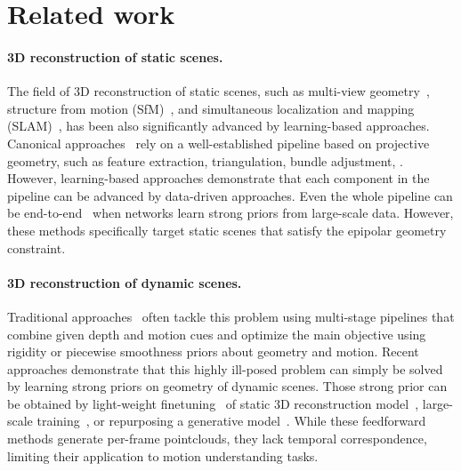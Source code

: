 \section{Related work}
\label{sec:related_work}

\paragraph{3D reconstruction of static scenes.}
The field of 3D reconstruction of static scenes, such as multi-view geometry~\citep{Ding:2022:TMV,Zhang:2023:GMV,Bae:2022:MVD}, structure from motion (SfM)~\citep{Pan:2024:GSF,Lindenberger:2021:PPS,Wang:2024:VSV}, and simultaneous localization and mapping (SLAM)~\citep{Lipson:2024:DPV,Teed:2021:DRO,Zhu:2024:NSL}, has been also significantly advanced by learning-based approaches.
Canonical approaches~\citep{Agarwal:2011:BRI,Furukawa:2010:TIS,Schonberger:2016:SFM} rely on a well-established pipeline based on projective geometry, such as feature extraction, triangulation, bundle adjustment, \etc.
However, learning-based approaches demonstrate that each component in the pipeline can be advanced by data-driven approaches.
Even the whole pipeline can be end-to-end~\citep{Weinzaepfel:2023:CRO,Wang:2024:DUS,Wang:2025:vgg,Zhang:2025:FLA,Wang:2024:3DR,Liang:2024:FFB,Elflein:2025:LTF} when networks learn strong priors from large-scale data.  
However, these methods specifically target static scenes that satisfy the epipolar geometry constraint.

\paragraph{3D reconstruction of dynamic scenes.}
Traditional approaches~\citep{Kumar:2017:MD3,Mustafa:2016:TC4,Luiten:2020:TTR} often tackle this problem using multi-stage pipelines that combine given depth and motion cues and optimize the main objective using rigidity or piecewise smoothness priors about geometry and motion.
Recent approaches demonstrate that this highly ill-posed problem can simply be solved by learning strong priors on geometry of dynamic scenes.
Those strong prior can be obtained by light-weight finetuning~\citep{Zhang:2025:MST,Lu:2024:A3R} of static 3D reconstruction model~\citep{Wang:2024:DUS}, large-scale training~\citep{Wang:2025:CUT}, or repurposing a generative model~\citep{Mai:2025:CVD}.
While these feedforward methods generate per-frame pointclouds, they lack temporal correspondence, limiting their application to motion understanding tasks.

